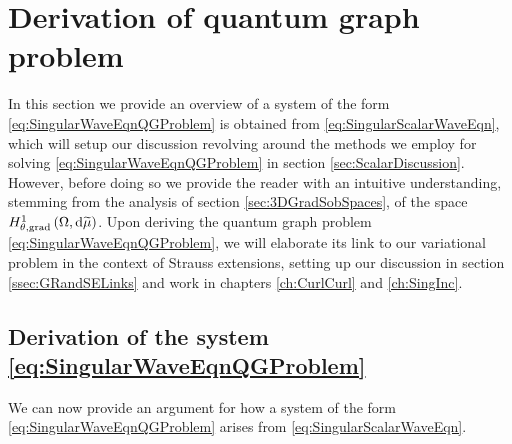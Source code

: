 \section{Derivation of quantum graph problem} \label{sec:ScalarDerivation}
In this section we provide an overview of a system of the form \eqref{eq:SingularWaveEqnQGProblem} is obtained from \eqref{eq:SingularScalarWaveEqn}, which will setup our discussion revolving around the methods we employ for solving \eqref{eq:SingularWaveEqnQGProblem} in section \ref{sec:ScalarDiscussion}.
However, before doing so we provide the reader with an intuitive understanding, stemming from the analysis of section \ref{sec:3DGradSobSpaces}, of the space $H^1_{\theta, \mathrm{grad}}\left( \Omega, \mathrm{d}\widetilde{\mu} \right)$.
Upon deriving the quantum graph problem \eqref{eq:SingularWaveEqnQGProblem}, we will elaborate its link to our variational problem in the context of Strauss extensions, setting up our discussion in section \ref{ssec:GRandSELinks} and work in chapters \ref{ch:CurlCurl} and \ref{ch:SingInc}.



\subsection{Derivation of the system \eqref{eq:SingularWaveEqnQGProblem}} \label{ssec:Scalar-QGDerivation}
We can now provide an argument for how a system of the form \eqref{eq:SingularWaveEqnQGProblem} arises from \eqref{eq:SingularScalarWaveEqn}.


